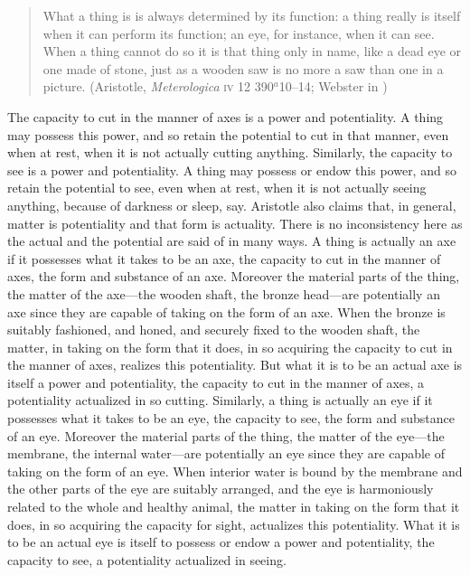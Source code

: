 \begin{quote}
	What a thing is is always determined by its function: a thing really is itself when it can perform its function; an eye, for instance, when it can see. When a thing cannot do so it is that thing only in name, like a dead eye or one made of stone, just as a wooden saw is no more a saw than one in a picture. (Aristotle, \emph{Meterologica} \textsc{iv} 12 390\( ^{a} \)10--14; Webster in \citealt[86]{Barnes:1984uq})
\end{quote}

The capacity to cut in the manner of axes is a power and potentiality. A thing may possess this power, and so retain the potential to cut in that manner, even when at rest, when it is not actually cutting anything. Similarly, the capacity to see is a power and potentiality. A thing may possess or endow this power, and so retain the potential to see, even when at rest, when it is not actually seeing anything, because of darkness or sleep, say. Aristotle also claims that, in general, matter is potentiality and that form is actuality. There is no inconsistency here as the actual and the potential are said of in many ways. A thing is actually an axe if it possesses what it takes to be an axe, the capacity to cut in the manner of axes, the form and substance of an axe. Moreover the material parts of the thing, the matter of the axe---the wooden shaft, the bronze head---are potentially an axe since they are capable of taking on the form of an axe. When the bronze is suitably fashioned, and honed, and securely fixed to the wooden shaft, the matter, in taking on the form that it does, in so acquiring the capacity to cut in the manner of axes, realizes this potentiality. But what it is to be an actual axe is itself a power and potentiality, the capacity to cut in the manner of axes, a potentiality actualized in so cutting. Similarly, a thing is actually an eye if it possesses what it takes to be an eye, the capacity to see, the form and substance of an eye. Moreover the material parts of the thing, the matter of the eye---the membrane, the internal water---are potentially an eye since they are capable of taking on the form of an eye. When interior water is bound by the membrane and the other parts of the eye are suitably arranged, and the eye is harmoniously related to the whole and healthy animal, the matter in taking on the form that it does, in so acquiring the capacity for sight, actualizes this potentiality. What it is to be an actual eye is itself to possess or endow a power and potentiality, the capacity to see, a potentiality actualized in seeing.


